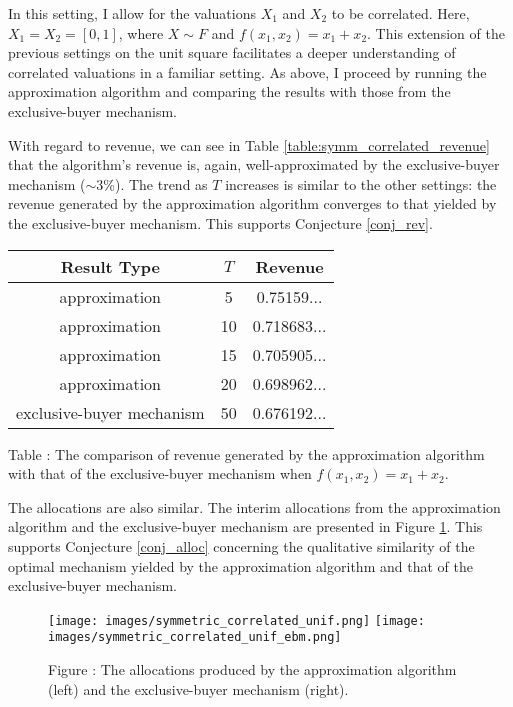 In this setting, I allow for the valuations $X_1$ and $X_2$ to be correlated. Here, $X_1 = X_2 = [0,1]$, where $X \sim F$ and $f(x_1,x_2) = x_1+x_2$. This extension of the previous settings on the unit square facilitates a deeper understanding of correlated valuations in a familiar setting. As above, I proceed by running the approximation algorithm and comparing the results with those from the exclusive-buyer mechanism.

With regard to revenue, we can see in Table \ref{table:symm_correlated_revenue} that the algorithm's revenue is, again, well-approximated by the exclusive-buyer mechanism ($\sim$3\%). The trend as $T$ increases is similar to the other settings: the revenue generated by the approximation algorithm converges to that yielded by the exclusive-buyer mechanism. This supports Conjecture \ref{conj_rev}.

\begin{center}
    \begin{tabular}{ |c|c|c| } 
    \hline
    Result Type & $T$ & Revenue \\
    \hline
    \hline
    approximation & 5 & 0.75159... \\ 
    approximation & 10 & 0.718683... \\ 
    approximation & 15 & 0.705905... \\ 
    approximation & 20 & 0.698962... \\ 
    exclusive-buyer mechanism & 50 & 0.676192... \\
    \hline
    \end{tabular}

    \vspace{1mm}
    \raggedright{\small {\sc Table \thefig\label{table:symm_correlated_revenue}:} The comparison of revenue generated by the approximation algorithm with that of the exclusive-buyer mechanism when $f(x_1,x_2) = x_1 + x_2$.}
\end{center}

The allocations are also similar. The interim allocations from the approximation algorithm and the exclusive-buyer mechanism are presented in Figure \ref{fig:symmetric_correlated_alloc}. This supports Conjecture \ref{conj_alloc} concerning the qualitative similarity of the optimal mechanism yielded by the approximation algorithm and that of the exclusive-buyer mechanism.

\begin{figure}[H]
    \begin{center}
    \texttt{[image: images/symmetric\_correlated\_unif.png]}
    \texttt{[image: images/symmetric\_correlated\_unif\_ebm.png]}
    \end{center}
    
    \vspace{1mm}
    \raggedright{\small {\sc Figure \thefig\label{fig:symmetric_correlated_alloc}:} The allocations produced by the approximation algorithm (left) and the exclusive-buyer mechanism (right).} 
\end{figure}

